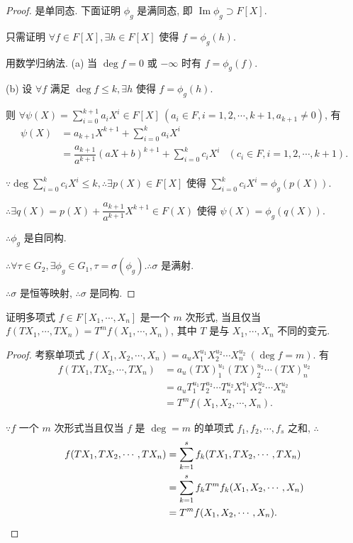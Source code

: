 \documentclass[UTF8]{ctexart}
\begin{document}
\begin{proof}
    是单同态. 下面证明 $\phi_g$ 是满同态, 即 $\operatorname{Im}\phi_g\supset F[X]$.

    只需证明 $\forall f\in F[X],\exists h\in F[X]$ 使得 $f=\phi_g(h)$.

    用数学归纳法. (a) 当 $\deg f=0$ 或 $-\infty$ 时有 $f=\phi_g(f)$.

    (b) 设 $\forall f$ 满足 $\deg f\leq k,\exists h$ 使得 $f=\phi_g(h)$.

    则 $\forall\psi(X)=\sum\limits_{i=0}^{k+1}a_iX^i\in F[X]\ (a_i\in F,i=1,2,\cdots,k+1,a_{k+1}\neq0)$, 有
    \begin{align*}
        \psi(X) & =a_{k+1}X^{k+1}+\sum\limits_{i=0}^{k}a_iX^i \\
        & =\dfrac{a_{k+1}}{a^{k+1}}(aX+b)^{k+1}+\sum\limits_{i=0}^{k}c_iX^i & (c_i\in F,i=1,2,\cdots,k+1).
    \end{align*}

    $\because\deg\sum\limits_{i=0}^{k}c_iX^i\leq k,\therefore\exists p(X)\in F[X]$ 使得 $\sum\limits_{i=0}^{k}c_iX^i=\phi_g(p(X))$.

    $\therefore\exists q(X)=p(X)+\dfrac{a_{k+1}}{a^{k+1}}X^{k+1}\in F(X)$ 使得 $\psi(X)=\phi_g(q(X))$.

    $\therefore\phi_g$ 是自同构.

    $\therefore\forall\tau\in G_2,\exists\phi_g\in G_1,\tau=\sigma(\phi_g).\therefore\sigma$ 是满射.

    $\therefore\sigma$ 是恒等映射, $\therefore\sigma$ 是同构.
\end{proof}
\begin{exercise}%
    证明多项式 $f\in F[X_1,\cdots,X_n]$ 是一个 $m$ 次形式, 当且仅当 $f(TX_1,\cdots,TX_n)=T^mf(X_1,\cdots,X_n)$, 其中 $T$ 是与 $X_1,\cdots,X_n$ 不同的变元.
\end{exercise}
\begin{proof}
    考察单项式 $f(X_1,X_2,\cdots,X_n)=a_uX^{u_1}_1X^{u_2}_2\cdots X^{u_2}_n\ (\deg f=m)$. 有
    \begin{align*}
        f(TX_1,TX_2,\cdots,TX_n) & =a_u(TX)^{u_1}_1(TX)^{u_2}_2\cdots (TX)^{u_2}_n \\
        & =a_uT^{u_1}_1T^{u_2}_2\cdots T^{u_2}_nX^{u_1}_1X^{u_2}_2\cdots X^{u_2}_n \\
        & =T^mf(X_1,X_2,\cdots,X_n).
    \end{align*}

    $\because f$ 一个 $m$ 次形式当且仅当 $f$ 是 $\deg=m$ 的单项式 $f_1,f_2,\cdots,f_s$ 之和, $\therefore$
    \begin{align*}
        f(TX_1,TX_2,\cdots,TX_n) & =\sum\limits_{k=1}^sf_k(TX_1,TX_2,\cdots,TX_n) \\
        & =\sum\limits_{k=1}^sf_kT^mf_k(X_1,X_2,\cdots,X_n) \\
        & =T^mf(X_1,X_2,\cdots,X_n).\qedhere
    \end{align*}
\end{proof}
\end{document}
